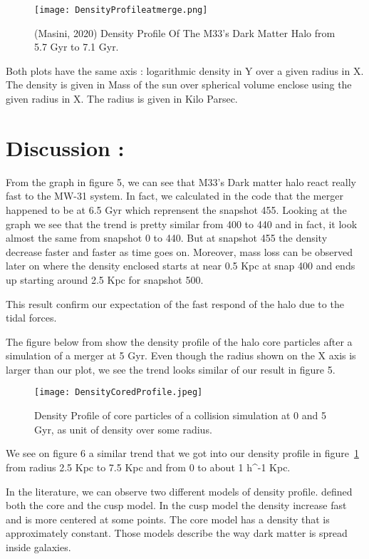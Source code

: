 \documentclass{aastex63}
\begin{document}
\begin{figure}[h]
    \centering
    \texttt{[image: DensityProfileatmerge.png]}
    \caption{(Masini, 2020) Density Profile Of The M33's Dark Matter Halo from 5.7 Gyr to 7.1 Gyr.}
    \label{fig:Snap400to500}
\end{figure}

Both plots have the same axis : logarithmic density in Y over a given radius in X. The density is given in Mass of the sun over spherical volume enclose using the given radius in X. The radius is given in Kilo Parsec.


\section{Discussion :}

From the graph in figure 5, we can see that M33's Dark matter halo react really fast to the MW-31 system. In fact, we calculated in the code that the merger happened to be at 6.5 Gyr which reprensent the snapshot 455. Looking at the graph we see that the trend is pretty similar from 400 to 440 and in fact, it look almost the same from snapshot 0 to 440. But at snapshot 455 the density decrease faster and faster as time goes on. Moreover, mass loss can be observed later on where the density enclosed starts at near 0.5 Kpc at snap 400 and ends up starting around 2.5 Kpc for snapshot 500.

This result confirm our expectation of the fast respond of the halo due to the tidal forces.

The figure below from \cite{Boylan2004} show the density profile of the halo core particles after a simulation of a merger at 5 Gyr. Even though the radius shown on the X axis is larger than our plot, we see the trend looks similar of our result in figure 5.

\begin{figure}[h]
    \centering
    \texttt{[image: DensityCoredProfile.jpeg]}
    \caption{\cite{Boylan2004} Density Profile of core particles of a collision simulation at 0 and 5 Gyr, as unit of density over some radius.}
    \label{fig:galaxy}
\end{figure}

We see on figure 6 a similar trend that we got into our density profile in figure~\ref{fig:Snap400to500} from radius 2.5 Kpc to 7.5 Kpc and from 0 to about 1 h^{-1} Kpc.

In the literature, we can observe two different models of density profile. \cite{deBlok10} defined both the core and the cusp model. In the cusp model the density increase fast and is more centered at some points. The core model has a density that is approximately constant. Those models describe the way dark matter is spread inside galaxies. 
\end{document}
